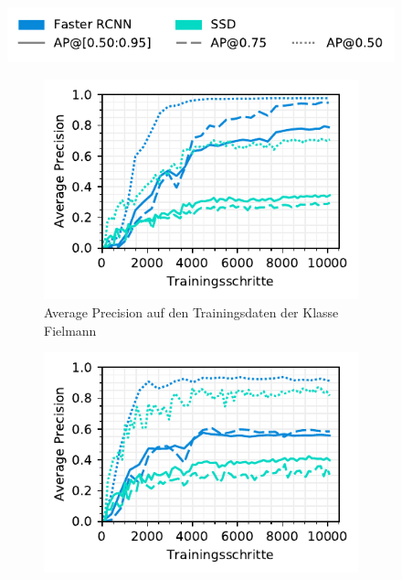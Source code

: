 \begin{figure}[h!] 
  \captionsetup{width=.9\linewidth}
  \caption{Average Precision auf den Trainings- und Validierungsdaten der Leistungserbringer spezifischen Modelle}
  \label{fig:specific-ie}
  \centering
  \includegraphics[scale=1]{graphics/matplot/img-detection__legend_3.pdf}
  \begin{subfigure}[b]{0.45\linewidth}
    \centering
    \includegraphics[scale=1]{graphics/matplot/img-detection__fielmann__ap__train.pdf}
    \caption{Average Precision auf den Trainingsdaten der Klasse Fielmann} 
    \label{fig:specific-ie:fielmann:ap_train}
    \vspace{2ex}
  \end{subfigure}%
  \begin{subfigure}[b]{0.45\linewidth}
    \centering
    \includegraphics[scale=1]{graphics/matplot/img-detection__visilab__ap.pdf}

\end{subfigure}
\end{figure}
